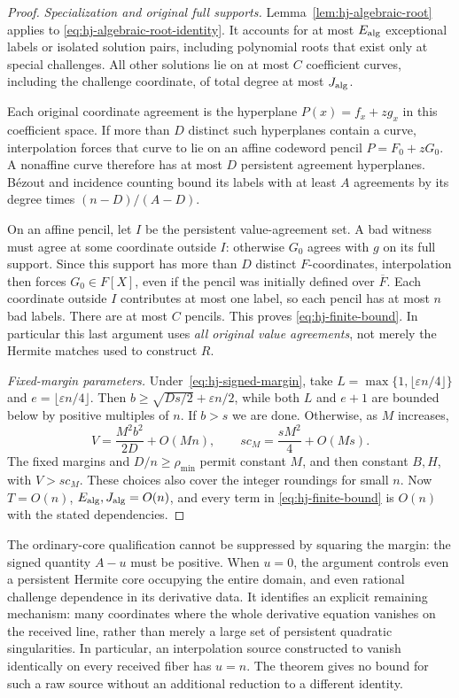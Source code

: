 \begin{proof}
\emph{Specialization and original full supports.}
Lemma~\ref{lem:hj-algebraic-root} applies to
\eqref{eq:hj-algebraic-root-identity}.  It accounts for at most
$E_{\rm alg}$ exceptional labels or isolated solution pairs, including
polynomial roots that exist only at special challenges.  All other
solutions lie on at most $C$ coefficient curves, including the
challenge coordinate, of total degree at most $J_{\rm alg}$.

Each original coordinate agreement is the hyperplane
$P(x)=f_x+zg_x$ in this coefficient space.  If more than $D$ distinct
such hyperplanes contain a curve, interpolation forces that curve
to lie on an affine codeword pencil $P=F_0+zG_0$.  A nonaffine curve
therefore has at most $D$ persistent agreement hyperplanes.
B\'ezout and incidence counting bound its labels with at least $A$
agreements by its degree times $(n-D)/(A-D)$.

On an affine pencil, let $I$ be the persistent value-agreement set.
A bad witness must agree at some coordinate outside $I$: otherwise
$G_0$ agrees with $g$ on its full support. Since this support has
more than $D$ distinct $F$-coordinates, interpolation then forces
$G_0\in F[X]$, even if the pencil was initially defined over
$\overline F$.  Each coordinate outside
$I$ contributes at most one label, so each pencil has at most $n$
bad labels.  There are at most $C$ pencils.  This proves
\eqref{eq:hj-finite-bound}.  In particular this last argument uses
\emph{all original value agreements}, not merely the Hermite matches
used to construct $R$.

\emph{Fixed-margin parameters.}
Under~\eqref{eq:hj-signed-margin}, take
$L=\max\{1,\lfloor\varepsilon n/4\rfloor\}$ and
$e=\lfloor\varepsilon n/4\rfloor$.  Then
$b\ge\sqrt{Ds/2}+\varepsilon n/2$, while both $L$ and $e+1$
are bounded below by positive multiples of $n$.  If $b>s$ we are done.  Otherwise, as $M$ increases,
\[
 V=\frac{M^2b^2}{2D}+O(Mn),\qquad
 sc_M=\frac{sM^2}{4}+O(Ms).
\]
The fixed margins and $D/n\ge\rho_{\min}$ permit constant $M$, and
then constant $B,H$, with $V>sc_M$.  These choices also cover the integer roundings for small $n$.
Now $T=O(n)$,
$E_{\rm alg},J_{\rm alg}=O(n)$, and every term in
\eqref{eq:hj-finite-bound} is $O(n)$ with the stated dependencies.
\end{proof}

The ordinary-core qualification cannot be suppressed by squaring the
margin: the signed quantity $A-u$ must be positive.  When $u=0$, the
argument controls even a persistent Hermite core occupying the entire
domain, and even rational challenge dependence in its derivative data.
It identifies an explicit remaining mechanism: many coordinates where
the whole derivative equation vanishes on the received line, rather
than merely a large set of persistent quadratic singularities.
In particular, an interpolation source constructed to vanish identically
on every received fiber has $u=n$.  The theorem gives no bound for such
a raw source without an additional reduction to a different identity.


